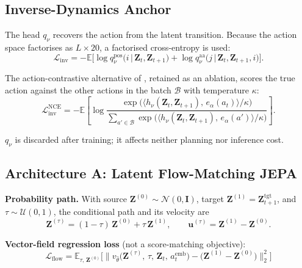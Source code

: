 \documentclass[12pt, a4paper]{article}
\begin{document}
\subsection{Inverse-Dynamics Anchor}

The head $q_\nu$ recovers the action from the latent transition. Because the action space factorises as $L \times 20$, a factorised cross-entropy is used:
\begin{equation}
    \mathcal{L}_\text{inv} = -\mathbb{E}\Big[\log q_\nu^{\text{pos}}\big(i \,\big|\, \mathbf{Z}_t, \mathbf{Z}_{t+1}\big) + \log q_\nu^{\text{aa}}\big(j \,\big|\, \mathbf{Z}_t, \mathbf{Z}_{t+1}, i\big)\Big].
\end{equation}

\noindent The action-contrastive alternative of \citet{boylan2026nogaussian}, retained as an ablation, scores the true action against the other actions in the batch $\mathcal{B}$ with temperature $\kappa$:
\begin{equation}
    \mathcal{L}_\text{inv}^{\text{NCE}} = -\mathbb{E}\left[\log \frac{\exp\big(\langle h_\nu(\mathbf{Z}_t, \mathbf{Z}_{t+1}),\, e_\alpha(a_t)\rangle / \kappa\big)}{\sum_{a' \in \mathcal{B}} \exp\big(\langle h_\nu(\mathbf{Z}_t, \mathbf{Z}_{t+1}),\, e_\alpha(a')\rangle / \kappa\big)}\right].
\end{equation}

\noindent $q_\nu$ is discarded after training; it affects neither planning nor inference cost.

\subsection{Architecture A: Latent Flow-Matching JEPA}

\noindent \textbf{Probability path.} With source $\mathbf{Z}^{(0)} \sim \mathcal{N}(0, \mathbf{I})$, target $\mathbf{Z}^{(1)} = \mathbf{Z}_{t+1}^{\text{tgt}}$, and $\tau \sim \mathcal{U}(0,1)$, the conditional path and its velocity are
\begin{equation}
    \mathbf{Z}^{(\tau)} = (1-\tau)\,\mathbf{Z}^{(0)} + \tau\,\mathbf{Z}^{(1)}, \qquad \mathbf{u}^{(\tau)} = \mathbf{Z}^{(1)} - \mathbf{Z}^{(0)}.
\end{equation}

\noindent \textbf{Vector-field regression loss} (not a score-matching objective):
\begin{equation}
    \mathcal{L}_\text{flow} = \mathbb{E}_{\tau,\,\mathbf{Z}^{(0)}}\Big[\big\lVert v_{\hat{\theta}}\big(\mathbf{Z}^{(\tau)},\, \tau,\, \mathbf{Z}_t,\, a_t^\text{emb}\big) - \big(\mathbf{Z}^{(1)} - \mathbf{Z}^{(0)}\big)\big\rVert_2^2\Big]
\end{equation}
\end{document}
